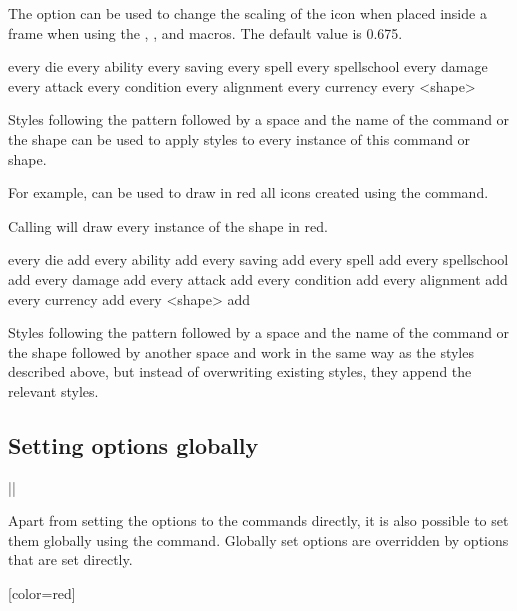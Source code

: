 \documentclass[a4paper]{article}
\begin{document}
The  option can be used to change the scaling of the icon when placed inside a frame when using the \macro{\ability}, \macro{\saving}, \macro{\spellschool} and \macro{\damage} macros. The default value is 0.675.

\begin{macrodef}
every die
every ability
every saving
every spell
every spellschool
every damage
every attack
every condition
every alignment
every currency
every <shape>
\end{macrodef}
Styles following the pattern  followed by a space and the name of the command or the shape can be used to apply styles to every instance of this command or shape.

For example,  can be used to draw in red all icons created using the \macro{\die} command.

Calling  will draw every instance of the  shape in red.

\begin{macrodef}
every die add
every ability add
every saving add
every spell add
every spellschool add
every damage add
every attack add
every condition add
every alignment add
every currency add
every <shape> add
\end{macrodef}
Styles following the pattern  followed by a space and the name of the command or the shape followed by another space and  work in the same way as the styles described above, but instead of overwriting existing styles, they append the relevant styles.

\subsection{Setting options globally}

\begin{macrodef}
|\rpgiconsset|
\end{macrodef}
Apart from setting the options to the commands directly, it is also possible to set them globally using the \macro{\rpgiconsset} command. Globally set options are overridden by options that are set directly.

\begin{codeexample}

[color=red]
\end{codeexample}
\end{document}
